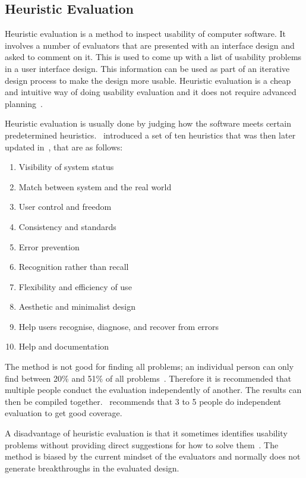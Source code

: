 \subsection{Heuristic Evaluation}
Heuristic evaluation is a method to inspect usability of computer
software. It involves a number of evaluators that are presented with
an interface design and asked to comment on it. This is used to come
up with a list of usability problems in a user interface design. This
information can be used as part of an iterative design process to make the design more usable. Heuristic evaluation is a cheap and intuitive way of doing usability evaluation and it does not require advanced planning~\cite{Nielsen1990}.

Heuristic evaluation is usually done by judging how the software meets certain predetermined heuristics.~\cite{Nielsen1990} introduced a set of ten heuristics that was then later updated in~\cite{Nielsen1994}, that are as follows:

\begin{enumerate}
  \item Visibility of system status
  \item Match between system and the real world
  \item User control and freedom
  \item Consistency and standards
  \item Error prevention
  \item Recognition rather than recall
  \item Flexibility and efficiency of use
  \item Aesthetic and minimalist design
  \item Help users recognise, diagnose, and recover from errors
  \item Help and documentation
\end{enumerate}

The method is not good for finding all problems; an individual person can only find between 20\% and 51\% of all problems~\cite{Nielsen1990}. Therefore it is recommended that multiple people conduct the evaluation independently of another. The results can then be compiled together.~\cite{Nielsen1990} recommends that 3 to 5 people do independent evaluation to get good coverage.

A disadvantage of heuristic evaluation is that it sometimes identifies usability problems without providing direct suggestions for how to solve them~\cite{Nielsen1990}. The method is biased by the current mindset of the evaluators and normally does not generate breakthroughs in the evaluated design.

